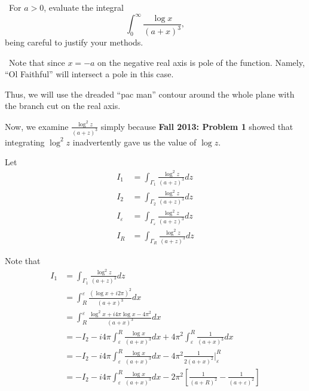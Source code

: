 \documentclass[12pt]{Homework}
\begin{document}
\begin{problem} $\,$
For $a>0$, evaluate the integral $$\int_0^\infty\frac{\log x}{(a+x)^3},$$ being careful to justify your methods.
\end{problem}


\begin{solution}$\,$
Note that since $x=-a$ on the negative real axis is pole of the function. Namely, ``Ol Faithful'' will intersect a pole in this case. 

Thus, we will use the dreaded ``pac man'' contour around the whole plane with the branch cut on the real axis. 

\begin{center}
\end{center}

Now, we examine $\frac{\log^2z}{(a+z)^3}$ simply because \textbf{Fall 2013: Problem 1} showed that integrating $\log^2z$ inadvertently gave us the value of $\log z$. 

Let \begin{align*}
    I_1&=\int_{\Gamma_1}\frac{\log^2 z}{(a+z)^3}dz\\
    I_2&=\int_{\Gamma_2}\frac{\log^2 z}{(a+z)^3}dz\\
    I_\varepsilon&=\int_{\Gamma_\varepsilon}\frac{\log^2 z}{(a+z)^3}dz\\
    I_R&=\int_{\Gamma_R}\frac{\log^2 z}{(a+z)^3}dz
\end{align*}

Note that \begin{align*}
    I_1&=\int_{\Gamma_1}\frac{\log^2 z}{(a+z)^3}dz\\
    &=\int_R^\varepsilon\frac{(\log x+i2\pi)^2}{(a+x)^3}dx\\
    &=\int_R^\varepsilon\frac{\log^2 x+i4\pi\log x-4\pi^2}{(a+x)^3}dx\\
    &=-I_2-i4\pi\int_\varepsilon^R\frac{\log x}{(a+x)^3}dx+4\pi^2\int_\varepsilon^R\frac{1}{(a+x)^3}dx\\
    &=-I_2-i4\pi\int_\varepsilon^R\frac{\log x}{(a+x)^3}dx-4\pi^2\frac{1}{2(a+x)^2}\Big|_\varepsilon^R\\
    &=-I_2-i4\pi\int_\varepsilon^R\frac{\log x}{(a+x)^3}dx-2\pi^2\left[\frac{1}{(a+R)^2}-\frac{1}{(a+\varepsilon)^2}\right]
\end{align*}


\end{solution}
\end{document}
